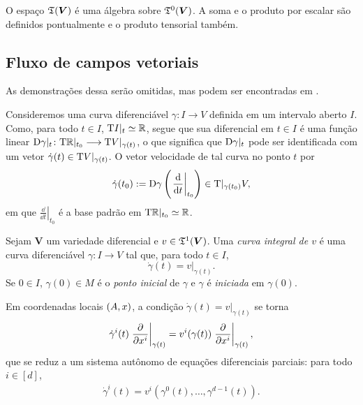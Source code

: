 O espaço $\mathfrak{T} (\bm V)$ é uma álgebra sobre $\mathfrak{T}^0(\bm V)$. A soma e o produto por escalar são definidos pontualmente e o produto tensorial também.





\subsection{Fluxo de campos vetoriais}

As demonstrações dessa serão omitidas, mas podem ser encontradas em  \cite{liv:Lee-IntroductionSmoothManifolds}.

Consideremos uma curva diferenciável $\gamma\colon I \to V$ definida em um intervalo aberto $I$. Como, para todo $t \in I$, $\mathrm{T} I|_t \simeq \mathbb{R}$, segue que sua diferencial em $t \in I$ é uma função linear ${\mathrm{D} \gamma|_t}\colon {\mathrm{T}\mathbb{R}|_{t_0}} \longrightarrow {\mathrm{T}V|_{\gamma(t)}}$, o que significa que $\mathrm{D} \gamma|_t$ pode ser identificada com um vetor $\dot \gamma(t) \in \mathrm{T} V|_{\gamma(t)}$. O vetor velocidade de tal curva no ponto $t$ por
	\begin{equation*}
	\dot \gamma(t_0) := \mathrm{D} \gamma \left( \left. \frac{\mathrm{d}}{\mathrm{d} t}\right|_{t_0} \right) \in \mathrm{T}|_{\gamma(t_0)} V,
	\end{equation*}
em que $\left. \frac{\dd}{\dd t}\right|_{t_0}$ é a base padrão em $\mathrm{T} \mathbb{R}|_{t_0} \simeq \mathbb{R}$.%

\begin{definition}
Sejam $\bm V$ um variedade diferencial e $v \in \mathfrak{T}^1(\bm V)$. Uma \emph{curva integral de $v$} é uma curva diferenciável $\gamma\colon I \to V$ tal que, para todo $t \in I$,
	\begin{equation*}
	\dot \gamma(t) = v|_{\gamma(t)}.
	\end{equation*}
Se $0 \in I$, $\gamma(0) \in M$ é o \emph{ponto inicial} de $\gamma$ e $\gamma$ é \emph{iniciada} em $\gamma(0)$.
\end{definition}

Em coordenadas locais $(A,x)$, a condição $\dot \gamma(t) = v|_{\gamma(t)}$ se torna
	\begin{equation*}
	\dot \gamma^i(t) \left. \frac{\partial{}}{\partial{x^i}} \right|_{\gamma(t)} = v^i(\gamma(t)) \left. \frac{\partial{}}{\partial{x^i}} \right|_{\gamma(t)},
	\end{equation*}
que se reduz a um sistema autônomo de equações diferenciais parciais: para todo $i \in [d]$,
	\begin{align*}
	\dot \gamma^i(t) = v^i(\gamma^0(t),\ldots,\gamma^{d-1}(t)).
	\end{align*}

